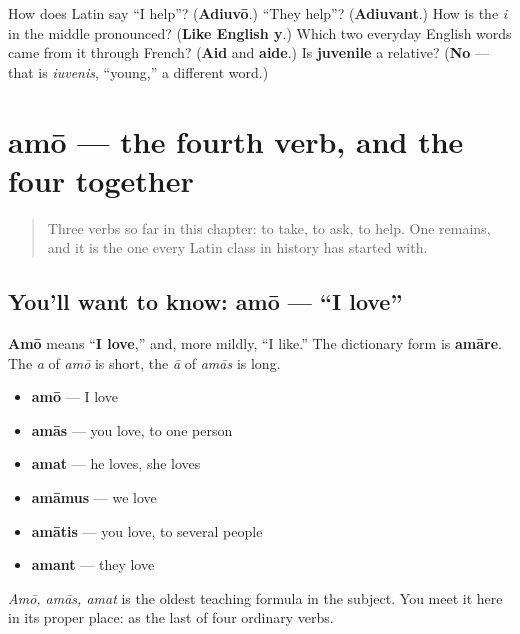 \begin{tcolorbox}[breakable,colback=teal!4,colframe=teal!35!black,title={Before you move on}]
How does Latin say \textquotedblleft{}I help\textquotedblright{}? (\textbf{Adiuvō}.) \textquotedblleft{}They help\textquotedblright{}? (\textbf{Adiuvant}.) How is the \emph{i} in the middle pronounced? (\textbf{Like English y}.) Which two everyday English words came from it through French? (\textbf{Aid} and \textbf{aide}.) Is \textbf{juvenile} a relative? (\textbf{No} — that is \emph{iuvenis}, \textquotedblleft{}young,\textquotedblright{} a different word.)
\end{tcolorbox}
\section[amō, amāre]{amō — the fourth verb, and the four together}

\label{lesson:LA-C39-amo}



\begin{quote}
Three verbs so far in this chapter: to take, to ask, to help. One remains, and it is the one every Latin class in history has started with.
\end{quote}

\subsection*{You'll want to know: amō — \textquotedblleft{}I love\textquotedblright{}}
\textbf{Amō} means \textquotedblleft{}\textbf{I love},\textquotedblright{} and, more mildly, \textquotedblleft{}I like.\textquotedblright{} The dictionary form is \textbf{amāre}. The \emph{a} of \emph{amō} is short, the \emph{ā} of \emph{amās} is long.

\begin{itemize}
\raggedright
  \item \textbf{amō} — I love
  \item \textbf{amās} — you love, to one person
  \item \textbf{amat} — he loves, she loves
  \item \textbf{amāmus} — we love
  \item \textbf{amātis} — you love, to several people
  \item \textbf{amant} — they love
\end{itemize}

\emph{Amō, amās, amat} is the oldest teaching formula in the subject. You meet it here in its proper place: as the last of four ordinary verbs.

